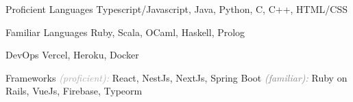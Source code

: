 

\begin{cvskills}

  \cvskill
  {Proficient Languages}
  {Typescript/Javascript, Java, Python, C, C++, HTML/CSS}

  \cvskill
  {Familiar Languages}
  {Ruby, Scala, OCaml, Haskell, Prolog}

  \cvskill
  {DevOps}
  {Vercel, Heroku, Docker}

  \cvskill
  {Frameworks}
  {\textcolor{darkgray}{\textit{(proficient):}} React, NestJs, NextJs, Spring Boot \textcolor{gray}{\textit{(familiar):}} Ruby on Rails, VueJs, Firebase, Typeorm}

\end{cvskills}
